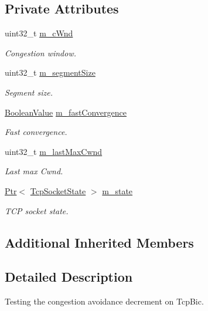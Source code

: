 \subsection*{Private Attributes}
\begin{DoxyCompactItemize}
\item 
uint32\+\_\+t \hyperlink{classTcpBicDecrementTest_a1facb1a7596141c8a5e49af8ebad7261}{m\+\_\+c\+Wnd}
\begin{DoxyCompactList}\small\item\em Congestion window. \end{DoxyCompactList}\item 
uint32\+\_\+t \hyperlink{classTcpBicDecrementTest_a6430400f92d1bcb3832692cdb4936475}{m\+\_\+segment\+Size}
\begin{DoxyCompactList}\small\item\em Segment size. \end{DoxyCompactList}\item 
\hyperlink{classns3_1_1BooleanValue}{Boolean\+Value} \hyperlink{classTcpBicDecrementTest_ab7843c294958bc856516bd2713edce99}{m\+\_\+fast\+Convergence}
\begin{DoxyCompactList}\small\item\em Fast convergence. \end{DoxyCompactList}\item 
uint32\+\_\+t \hyperlink{classTcpBicDecrementTest_a821e60a1b65ae88f0659eaa45225ca1b}{m\+\_\+last\+Max\+Cwnd}
\begin{DoxyCompactList}\small\item\em Last max Cwnd. \end{DoxyCompactList}\item 
\hyperlink{classns3_1_1Ptr}{Ptr}$<$ \hyperlink{classns3_1_1TcpSocketState}{Tcp\+Socket\+State} $>$ \hyperlink{classTcpBicDecrementTest_a917e5a2c5da454fc06ee7d5be6814d47}{m\+\_\+state}
\begin{DoxyCompactList}\small\item\em T\+CP socket state. \end{DoxyCompactList}\end{DoxyCompactItemize}
\subsection*{Additional Inherited Members}


\subsection{Detailed Description}
Testing the congestion avoidance decrement on Tcp\+Bic. 

